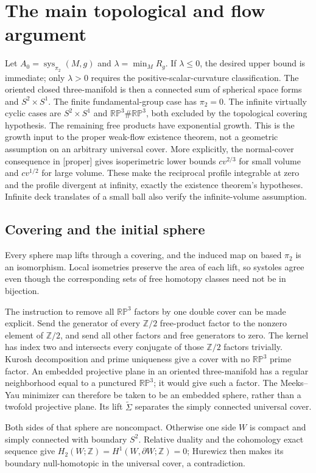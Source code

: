 \documentclass[10pt]{article}
\begin{document}
\section*{The main topological and flow argument}
Let \(A_0=\operatorname{sys}_{\pi_2}(M,g)\) and \(\lambda=\min_M R_g\). If \(\lambda\le0\), the desired upper bound is immediate; only \(\lambda>0\) requires the positive-scalar-curvature classification. The oriented closed three-manifold is then a connected sum of spherical space forms and \(S^2\times S^1\). The finite fundamental-group case has \(\pi_2=0\). The infinite virtually cyclic cases are \(S^2\times S^1\) and \(\mathbb{RP}^3\#\mathbb{RP}^3\), both excluded by the topological covering hypothesis. The remaining free products have exponential growth. This is the growth input to the proper weak-flow existence theorem, not a geometric assumption on an arbitrary universal cover. More explicitly, the normal-cover consequence in [proper] gives isoperimetric lower bounds \(cv^{2/3}\) for small volume and \(cv^{1/2}\) for large volume. These make the reciprocal profile integrable at zero and the profile divergent at infinity, exactly the existence theorem’s hypotheses. Infinite deck translates of a small ball also verify the infinite-volume assumption.\par
\subsection*{Covering and the initial sphere}
Every sphere map lifts through a covering, and the induced map on based \(\pi_2\) is an isomorphism. Local isometries preserve the area of each lift, so systoles agree even though the corresponding sets of free homotopy classes need not be in bijection.\par
The instruction to remove all \(\mathbb{RP}^3\) factors by one double cover can be made explicit. Send the generator of every \(\mathbb Z/2\) free-product factor to the nonzero element of \(\mathbb Z/2\), and send all other factors and free generators to zero. The kernel has index two and intersects every conjugate of those \(\mathbb Z/2\) factors trivially. Kurosh decomposition and prime uniqueness give a cover with no \(\mathbb{RP}^3\) prime factor. An embedded projective plane in an oriented three-manifold has a regular neighborhood equal to a punctured \(\mathbb{RP}^3\); it would give such a factor. The Meeks–Yau minimizer can therefore be taken to be an embedded sphere, rather than a twofold projective plane. Its lift \(\widetilde\Sigma\) separates the simply connected universal cover.\par
Both sides of that sphere are noncompact. Otherwise one side \(W\) is compact and simply connected with boundary \(S^2\). Relative duality and the cohomology exact sequence give \(H_2(W;\mathbb Z)=H^1(W,\partial W;\mathbb Z)=0\); Hurewicz then makes its boundary null-homotopic in the universal cover, a contradiction.\par
\end{document}
